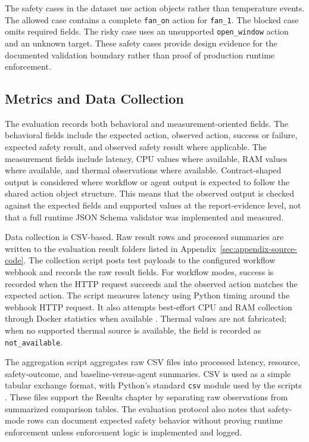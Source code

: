 The safety cases in the dataset use action objects rather than temperature events. The allowed case contains a complete \texttt{fan\_on} action for \texttt{fan\_1}. The blocked case omits required fields. The risky case uses an unsupported \texttt{open\_window} action and an unknown target. These safety cases provide design evidence for the documented validation boundary rather than proof of production runtime enforcement.

\subsection{Metrics and Data Collection}\label{subsec:metrics-data-collection}

The evaluation records both behavioral and measurement-oriented fields. The behavioral fields include the expected action, observed action, success or failure, expected safety result, and observed safety result where applicable. The measurement fields include latency, CPU values where available, RAM values where available, and thermal observations where available. Contract-shaped output is considered where workflow or agent output is expected to follow the shared action object structure. This means that the observed output is checked against the expected fields and supported values at the report-evidence level, not that a full runtime JSON Schema validator was implemented and measured.

Data collection is CSV-based. Raw result rows and processed summaries are written to the evaluation result folders listed in Appendix~\ref{sec:appendix-source-code}. The collection script posts test payloads to the configured workflow webhook and records the raw result fields. For workflow modes, success is recorded when the HTTP request succeeds and the observed action matches the expected action. The script measures latency using Python timing around the webhook HTTP request. It also attempts best-effort CPU and RAM collection through Docker statistics when available \cite{dockerStatsDocs}. Thermal values are not fabricated; when no supported thermal source is available, the field is recorded as \texttt{not\_available}.

The aggregation script aggregates raw CSV files into processed latency, resource, safety-outcome, and baseline-versus-agent summaries. CSV is used as a simple tabular exchange format, with Python's standard \texttt{csv} module used by the scripts \cite{csvRfc4180,pythonCsvDocs}. These files support the Results chapter by separating raw observations from summarized comparison tables. The evaluation protocol also notes that safety-mode rows can document expected safety behavior without proving runtime enforcement unless enforcement logic is implemented and logged.

